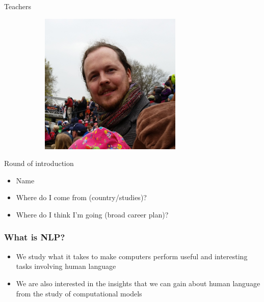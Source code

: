 \documentclass[dvipsnames]{beamer}
\begin{document}
\begin{frame}{Teachers}
\begin{figure}
\begin{subfigure}{.2\textwidth}
        \end{subfigure}
        \begin{subfigure}{.2\textwidth}
            \centering
            \includegraphics[width=.8\linewidth]{images/fw}
        \end{subfigure}%
    \end{figure}
\end{frame}

\begin{frame}{Round of introduction}
    \begin{itemize}
        \item Name
        \item Where do I come from (country/studies)?
        \item Where do I think I'm going (broad career plan)?
    \end{itemize}
\end{frame}

\begin{frame}
\frametitle{What is NLP?}
\begin{itemize}
\item We study what it takes to make computers perform useful and interesting tasks involving human language
\item We are also interested in the insights that we can gain about human language from the study of computational models
\end{itemize}
\end{frame}
\end{document}
